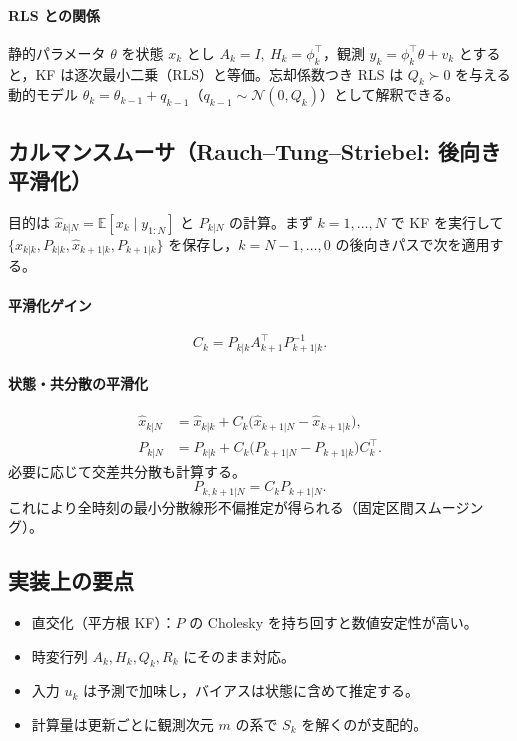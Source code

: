 \paragraph{RLS との関係}
静的パラメータ $\theta$ を状態 $x_k$ とし $A_k=I,\ H_k=\phi_k^\top$，観測 $y_k=\phi_k^\top \theta + v_k$ とすると，KF は逐次最小二乗（RLS）と等価。忘却係数つき RLS は $Q_k\succ0$ を与える動的モデル $\theta_{k}=\theta_{k-1}+q_{k-1}$（$q_{k-1}\sim\mathcal N(0,Q_k)$）として解釈できる。\cite{exp2025}

\subsection{カルマンスムーサ（Rauch--Tung--Striebel: 後向き平滑化）}
目的は $\hat x_{k|N}=\mathbb E[x_k\mid y_{1:N}]$ と $P_{k|N}$ の計算。まず $k=1,\dots,N$ で KF を実行して $\{\hat x_{k|k},P_{k|k},\hat x_{k+1|k},P_{k+1|k}\}$ を保存し，$k=N-1,\dots,0$ の後向きパスで次を適用する。

\paragraph{平滑化ゲイン}
\[
C_k = P_{k|k} A_{k+1}^\top P_{k+1|k}^{-1}.
\]

\paragraph{状態・共分散の平滑化}
\[
\begin{aligned}
  \hat x_{k|N} &= \hat x_{k|k} + C_k\bigl(\hat x_{k+1|N}-\hat x_{k+1|k}\bigr),\\
  P_{k|N} &= P_{k|k} + C_k\bigl(P_{k+1|N}-P_{k+1|k}\bigr) C_k^\top.
\end{aligned}
\]
必要に応じて交差共分散も計算する。
\[
P_{k,k+1|N} = C_k P_{k+1|N}.
\]
これにより全時刻の最小分散線形不偏推定が得られる（固定区間スムージング）。\cite{exp2025}

\subsection{実装上の要点}
\begin{itemize}\setlength{\itemsep}{2pt}
  \item 直交化（平方根 KF）：$P$ の Cholesky を持ち回すと数値安定性が高い。
  \item 時変行列 $A_k,H_k,Q_k,R_k$ にそのまま対応。
  \item 入力 $u_k$ は予測で加味し，バイアスは状態に含めて推定する。
  \item 計算量は更新ごとに観測次元 $m$ の系で $S_k$ を解くのが支配的。
\end{itemize}

